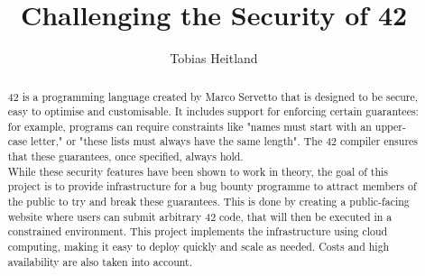 \documentclass[11pt
              , a4paper
              , twoside
              , openright
              , table
              ]{report}
\title{Challenging the Security of 42}
\author{Tobias Heitland}
\date{}
\begin{document}
\frontmatter



\begin{abstract}

42 is a programming language created by Marco Servetto that is designed to be secure, easy to optimise and customisable. It includes support for enforcing certain guarantees: for example, programs can require constraints like "names must start with an upper-case letter," or "these lists must always have the same length". The 42 compiler ensures that these guarantees, once specified, always hold.
\\[12pt]
While these security features have been shown to work in theory, the goal of this project is to provide infrastructure for a bug bounty programme to attract members of the public to try and break these guarantees. This is done by creating a public-facing website where users can submit arbitrary 42 code, that will then be executed in a constrained environment. This project implements the infrastructure using cloud computing, making it easy to deploy quickly and scale as needed. Costs and high availability are also taken into account.

\end{abstract}


\maketitle



\tableofcontents



\mainmatter


%
%
%
%




\backmatter



%


\end{document}
